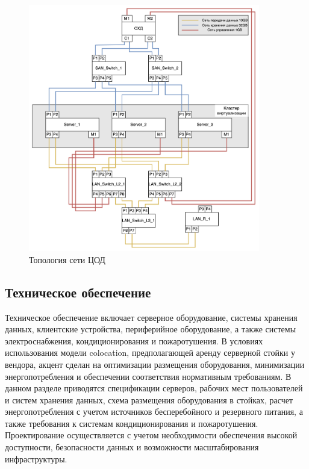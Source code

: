 \documentclass[14pt, a4paper]{extarticle}
\begin{document}
\begin{figure}[H]
  \centering
  \includegraphics[width=0.9\textwidth]{net_topo.png}
  \caption{Топология сети ЦОД}
  \label{fig:togo-network}
\end{figure}

\subsection{Техническое обеспечение}

Техническое обеспечение включает серверное оборудование, системы хранения данных, клиентские устройства,
периферийное оборудование, а также системы электроснабжения, кондиционирования и пожаротушения. В условиях
использования модели colocation, предполагающей аренду серверной стойки у вендора, акцент сделан на
оптимизации размещения оборудования, минимизации энергопотребления и обеспечении соответствия нормативным
требованиям. В данном разделе приводятся спецификации серверов, рабочих мест пользователей и систем
хранения данных, схема размещения оборудования в стойках, расчет энергопотребления с учетом источников
бесперебойного и резервного питания, а также требования к системам кондиционирования и пожаротушения.
Проектирование осуществляется с учетом необходимости обеспечения высокой доступности, безопасности
данных и возможности масштабирования инфраструктуры.
\end{document}
